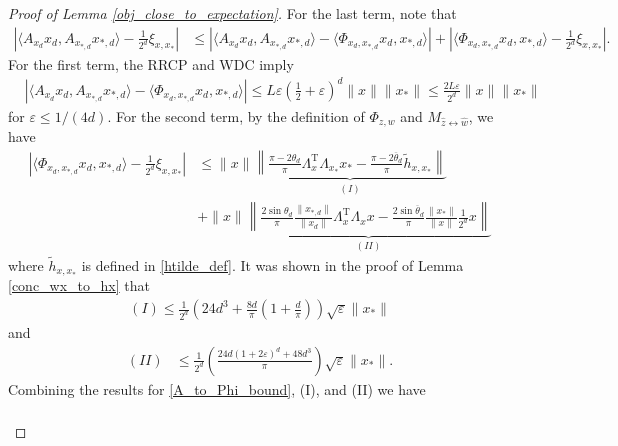\documentclass[11pt]{article}
\renewcommand{\epsilon}{\varepsilon}
\renewcommand{\top}{{\mathrm{T}}}
\theoremstyle{remark}
\begin{document}
\begin{proof}[Proof of Lemma \ref{obj_close_to_expectation}]
For the last term, note that \begin{align*}
\left| \langle A_{x_d}x_d, A_{x_{*,d}}x_{*,d}\rangle - \frac{1}{2^d}\xi_{x,x_*}\right| & \leqslant \left| \langle A_{x_d}x_d, A_{x_{*,d}}x_{*,d}\rangle - \langle \Phi_{x_d,x_{*,d}} x_d, x_{*,d}\rangle\right| + \left|\langle \Phi_{x_d,x_{*,d}} x_d, x_{*,d}\rangle - \frac{1}{2^d}\xi_{x,x_*}\right|.
\end{align*} For the first term, the RRCP and WDC imply
\begin{align}
& \left| \langle A_{x_d}x_d, A_{x_{*,d}}x_{*,d}\rangle - \langle \Phi_{x_d,x_{*,d}} x_d, x_{*,d}\rangle\right| \leqslant L\epsilon \left(\frac{1}{2}+\epsilon\right)^d\|x\|\|x_*\| \leqslant \frac{2L\epsilon}{2^d}\|x\|\|x_*\| \label{A_to_Phi_bound}
\end{align} for $\epsilon \leqslant 1/(4d)$. For the second term, by the definition of $\Phi_{z,w}$ and $M_{\hat{z} \leftrightarrow \hat{w}}$, we have 
\begin{align*}
\left|\langle \Phi_{x_d,x_{*,d}} x_d, x_{*,d}\rangle - \frac{1}{2^d}\xi_{x,x_*}\right| & \leqslant \|x\|\underbrace{\left\|\frac{\pi - 2\theta_d}{\pi}\Lambda_x^\top\Lambda_{x_*}x_* - \frac{\pi - 2\overline{\theta}_d}{\pi}\tilde{h}_{x,x_*}\right\|}_{(I)}\\
& +\|x\|\underbrace{\left\|\frac{2\sin \theta_d}{\pi}\frac{\|x_{*,d}\|}{\|x_d\|}\Lambda_x^\top \Lambda_x x - \frac{2\sin \overline{\theta}_d}{\pi} \frac{\|x_*\|}{\|x\|}\frac{1}{2^d}x\right\|}_{(II)}
\end{align*} where $\tilde{h}_{x,x_*}$ is defined in \eqref{htilde_def}. It was shown in the proof of Lemma \ref{conc_wx_to_hx} that \begin{align*}
(I) \leqslant \frac{1}{2^d} \left(24 d^3 + \frac{8d}{\pi}\left( 1+ \frac{d}{\pi}\right)\right)\sqrt{\epsilon}\|x_*\|
\end{align*} and \begin{align*}
(II) & %
\leqslant \frac{1}{2^d}\left(\frac{24d(1 + 2\epsilon)^d + 48d^3}{\pi}\right)\sqrt{\epsilon}\|x_*\|.
\end{align*} Combining the results for \eqref{A_to_Phi_bound}, (I), and (II) we have \begin{align}
\begin{split}

\end{split}
\end{align}
\end{proof}
\end{document}
